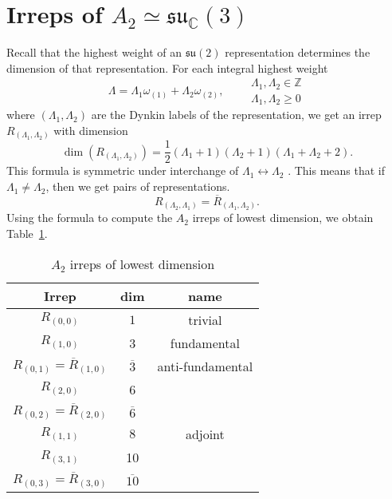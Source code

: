 
\section{Irreps of \texorpdfstring{$A_2 \simeq \mathfrak{su}_{\mathbb{C}}(3)$}{the Complexified Lie Algebra of SU(3)}}%
\label{sec:irreps_of_lie_algebra_of_su_3_}

Recall that the highest weight of an $\mathfrak{su}(2)$ representation determines the dimension of that representation.
For each integral highest weight
\begin{equation}
  \Lambda = \Lambda_1 \omega_{(1)} + \Lambda_2 \omega_{(2)}, \qquad
  \begin{gathered}
    \Lambda_1, \Lambda_2 \in \mathbb{Z} \\
    \Lambda_1, \Lambda_2 \geq 0
  \end{gathered}
\end{equation}
where $(\Lambda_1, \Lambda_2)$ are the Dynkin labels of the representation, we get an irrep $R_{(\Lambda_1, \Lambda_2)}$ with dimension 
\begin{equation}
  \dim(R_{(\Lambda_1, \Lambda_2)}) = \frac{1}{2} (\Lambda_1 + 1) (\Lambda_2 + 1) (\Lambda_1 + \Lambda_2 + 2).
\end{equation}
This formula is symmetric under interchange of $\Lambda_1 \leftrightarrow \Lambda_2$ .
This means that if $\Lambda_1 \neq \Lambda_2$, then we get pairs of representations. 
\begin{equation}
  R_{(\Lambda_2, \Lambda_1)} = \overline{R}_{(\Lambda_1, \Lambda_2)}.
\end{equation}
Using the formula to compute the $A_2$  irreps of lowest dimension, we obtain Table~\ref{tab:23-1}.

\begin{table}[htpb]
  \centering
  \begin{tabular}{ c | c  c }
    Irrep & dim & name \\
    \hline
    $R_{(0,0)}$ & $1$ & trivial \\
    $R_{(1, 0)}$ & 3 & fundamental \\
    $R_{(0, 1)} = \overline{R}_{(1, 0)}$ & $\overline{3}{}$ & anti-fundamental \\
    $R_{(2, 0)}$ & 6 &  \\
    $R_{(0, 2)} = \overline{R}_{(2, 0)}$ & $\overline{6}{}$ &  \\
    $R_{(1, 1)}$ & $8$ & adjoint \\
    $R_{(3, 1)}$ & 10 & \\
    $R_{(0, 3)} = \overline{R}_{(3, 0)}$ & $\overline{10}{}$ &  \\
  \end{tabular}
  \caption{$A_2$ irreps of lowest dimension}
  \label{tab:23-1}
\end{table} 

